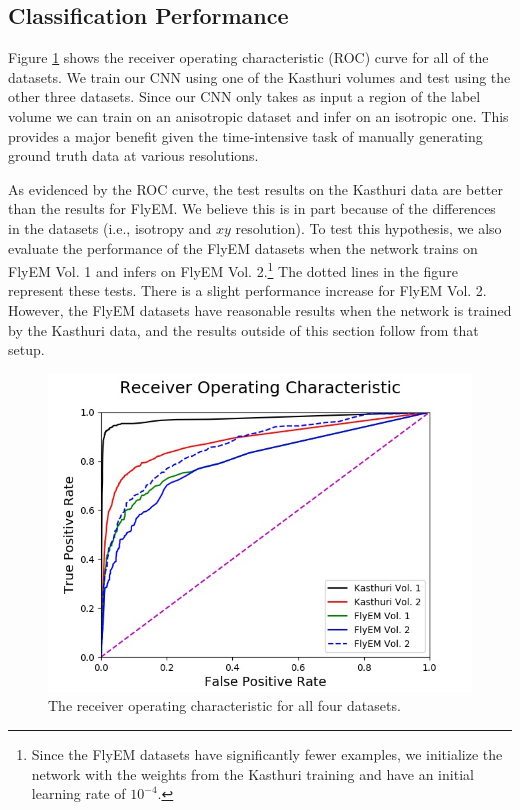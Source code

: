 \subsection{Classification Performance}

Figure \ref{fig:receiver-operating-characteristic} shows the receiver operating characteristic (ROC) curve for all of the datasets.
We train our CNN using one of the Kasthuri volumes and test using the other three datasets.
Since our CNN only takes as input a region of the label volume we can train on an anisotropic dataset and infer on an isotropic one.
This provides a major benefit given the time-intensive task of manually generating ground truth data at various resolutions.

As evidenced by the ROC curve, the test results on the Kasthuri data are better than the results for FlyEM.
We believe this is in part because of the differences in the datasets (i.e., isotropy and $xy$ resolution).
To test this hypothesis, we also evaluate the performance of the FlyEM datasets when the network trains on FlyEM Vol. 1 and infers on FlyEM Vol. 2.\footnote{Since the FlyEM datasets have significantly fewer examples, we initialize the network with the weights from the Kasthuri training and have an initial learning rate of $10^{-4}$.}
The dotted lines in the figure represent these tests.
There is a slight performance increase for FlyEM Vol. 2.
However, the FlyEM datasets have reasonable results when the network is trained by the Kasthuri data, and the results outside of this section follow from that setup.

\begin{figure}
	\centering
	\includegraphics[width=0.95\linewidth]{./figures/receiver-operating-characteristic.jpg}
	\caption{The receiver operating characteristic for all four datasets.}
	\label{fig:receiver-operating-characteristic}
\end{figure}

